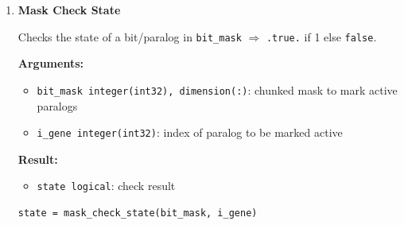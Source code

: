 \begin{enumerate}
\begin{lstlisting}[caption={Set Bit State in Mask}]
call mask_set_state(bit_mask, i_gene, state, ierr)
\end{lstlisting}


    \item \textbf{Mask Check State}

        Checks the state of a bit/paralog in \lstinline!bit_mask! \(\Rightarrow{}\) \lstinline!.true.! if 1 else \lstinline!false!.

        \textbf{Arguments:}
        \begin{itemize}
            \item \lstinline!bit_mask integer(int32), dimension(:)!: chunked mask to mark active paralogs
            \item \lstinline!i_gene integer(int32)!: index of paralog to be marked active
        \end{itemize}

        \textbf{Result:}
        \begin{itemize}
            \item \lstinline!state logical!: check result
        \end{itemize}

\begin{lstlisting}[caption={Check Bit State in Mask}]
state = mask_check_state(bit_mask, i_gene)
\end{lstlisting}

\end{enumerate}